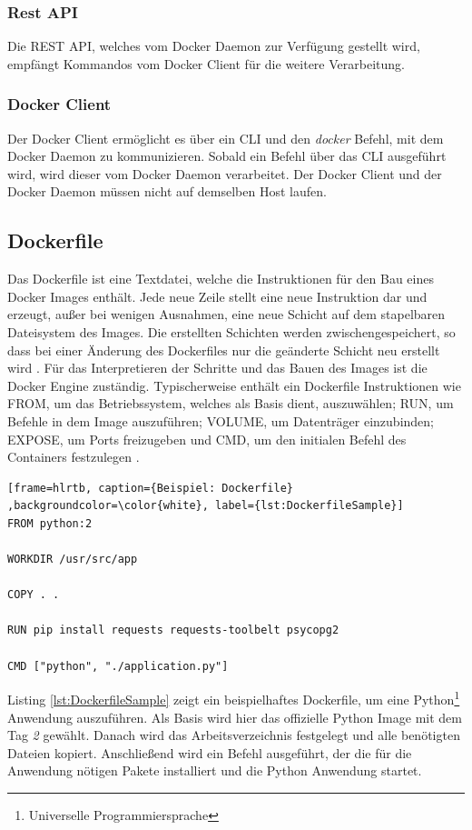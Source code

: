\subsubsection{Rest API}
\label{subsubsec:dockerapi}
Die \ac{REST} \ac{API}, welches vom Docker Daemon zur Verfügung gestellt wird, empfängt Kommandos vom Docker Client für die weitere Verarbeitung.

\subsubsection{Docker Client}
\label{subsubsec:dockerclient}
Der Docker Client ermöglicht es über ein \ac{CLI} und den \textit{docker} Befehl, mit dem Docker Daemon zu kommunizieren. Sobald ein Befehl über das \ac{CLI} ausgeführt wird, wird dieser vom Docker Daemon verarbeitet. Der Docker Client und der Docker Daemon müssen nicht auf demselben Host laufen.

\subsection{Dockerfile}
\label{subsec:dockerfile}
Das Dockerfile ist eine Textdatei, welche die Instruktionen für den Bau eines Docker Images enthält. Jede neue Zeile stellt eine neue Instruktion dar und erzeugt, außer bei wenigen Ausnahmen, eine neue Schicht auf dem stapelbaren Dateisystem des Images. Die erstellten Schichten werden zwischengespeichert, so dass bei einer Änderung des Dockerfiles nur die geänderte Schicht neu erstellt wird \cite{doc:overview}. Für das Interpretieren der Schritte und das Bauen des Images ist die Docker Engine zuständig. Typischerweise enthält ein Dockerfile Instruktionen wie FROM, um das Betriebssystem, welches als Basis dient, auszuwählen; RUN, um Befehle in dem Image auszuführen; VOLUME, um Datenträger einzubinden; EXPOSE, um Ports freizugeben und CMD, um den initialen Befehl des Containers festzulegen \cite{Grattafiori2016UnderstandingBy}.
\lstset{language=Dockerfile}
\begin{lstlisting}[frame=hlrtb, caption={Beispiel: Dockerfile} ,backgroundcolor=\color{white}, label={lst:DockerfileSample}]
FROM python:2

WORKDIR /usr/src/app

COPY . .

RUN pip install requests requests-toolbelt psycopg2

CMD ["python", "./application.py"]
\end{lstlisting}
Listing \ref{lst:DockerfileSample} zeigt ein beispielhaftes Dockerfile, um eine Python\footnote{\label{foot:python}Universelle Programmiersprache} Anwendung auszuführen. Als Basis wird hier das offizielle Python Image mit dem Tag \textit{2} gewählt. Danach wird das Arbeitsverzeichnis festgelegt und alle benötigten Dateien kopiert. Anschließend wird ein Befehl ausgeführt, der die für die Anwendung nötigen Pakete installiert und die Python Anwendung startet.

